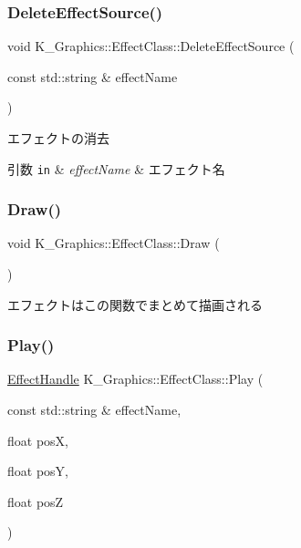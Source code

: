 \subsubsection{\texorpdfstring{Delete\+Effect\+Source()}{DeleteEffectSource()}}
{\footnotesize\ttfamily void K\+\_\+\+Graphics\+::\+Effect\+Class\+::\+Delete\+Effect\+Source (\begin{DoxyParamCaption}\item[{const std\+::string \&}]{effect\+Name }\end{DoxyParamCaption})}



エフェクトの消去 


\begin{DoxyParams}[1]{引数}
\mbox{\tt in}  & {\em effect\+Name} & エフェクト名 \\
\hline
\end{DoxyParams}
\mbox{\label{class_k___graphics_1_1_effect_class_aee527e320342f218b88293f41beec6e7}} 
\subsubsection{\texorpdfstring{Draw()}{Draw()}}
{\footnotesize\ttfamily void K\+\_\+\+Graphics\+::\+Effect\+Class\+::\+Draw (\begin{DoxyParamCaption}{ }\end{DoxyParamCaption})}



エフェクトはこの関数でまとめて描画される 

\mbox{\label{class_k___graphics_1_1_effect_class_ab9559608debb6f33a0c92b5886eecada}} 
\subsubsection{\texorpdfstring{Play()}{Play()}}
{\footnotesize\ttfamily \mbox{\hyperlink{namespace_k___graphics_afb3a0fd0adc77eb95104e697c9b6b7a9}{Effect\+Handle}} K\+\_\+\+Graphics\+::\+Effect\+Class\+::\+Play (\begin{DoxyParamCaption}\item[{const std\+::string \&}]{effect\+Name,  }\item[{float}]{posX,  }\item[{float}]{posY,  }\item[{float}]{posZ }\end{DoxyParamCaption})}




